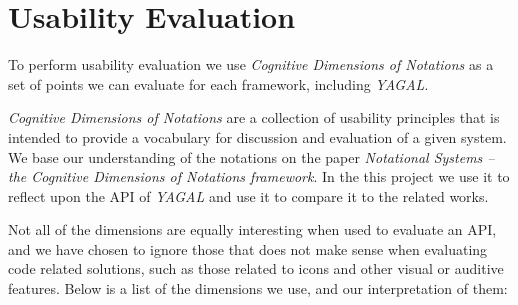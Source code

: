 \section{Usability Evaluation}\label{sec:vocab}
To perform usability evaluation we use \textit{Cognitive Dimensions of Notations} as a set of points we can evaluate for each framework, including \textit{YAGAL}.

\textit{Cognitive Dimensions of Notations} are a collection of usability principles that is intended to provide a vocabulary for discussion and evaluation of a given system. We base our understanding of the notations on the paper \textit{Notational Systems – the Cognitive Dimensions of Notations framework}\cite{cogDimUsage}. In the this project we use it to reflect upon the API of \textit{YAGAL} and use it to compare it to the related works.

Not all of the dimensions are equally interesting when used to evaluate an API, and we have chosen to ignore those that does not make sense when evaluating code related solutions, such as those related to icons and other visual or auditive features. Below is a list of the dimensions we use, and our interpretation of them:

